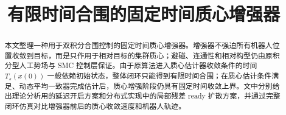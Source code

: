 \documentclass[onecolumn]{ctexart}
\title{有限时间合围的固定时间质心增强器}
\begin{document}
\maketitle

\begin{abstract}
本文整理一种用于双积分合围控制的固定时间质心增强器。增强器不强迫所有机器人位置收敛到目标，而是只作用于相对目标的集群质心；避碰、连通性和相对构型仍由原积分型人工势场与 SMC 控制层保证。由于原算法进入质心估计器收敛条件的时间 $T_s(x(0))$ 一般依赖初始状态，整体闭环只能得到有限时间合围；在质心估计条件满足、动态平均一致器完成估计后，质心增强阶段仍具有固定时间收敛上界。文中分别给出理论分析用的延迟开启方案和分布式实现中的局部残差 ready 扩散方案，并通过完整闭环仿真对比增强器前后的质心收敛速度和机器人轨迹。
\end{abstract}


\end{document}
